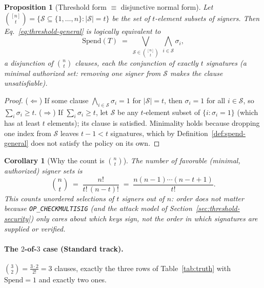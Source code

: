 \documentclass[11pt,a4paper]{article}
\theoremstyle{plain}
\newtheorem{proposition}[theorem]{Proposition}
\newtheorem{corollary}[theorem]{Corollary}
\theoremstyle{definition}
\begin{document}
\begin{proposition}[Threshold form $\equiv$ disjunctive normal form]\label{prop:dnf-general}
Let $\binom{[n]}{t}=\{\mathcal{S}\subseteq\{1,\dots,n\}:|\mathcal{S}|=t\}$ be the
set of $t$-element subsets of signers. Then Eq.~\eqref{eq:threshold-general} is
logically equivalent to
\begin{equation}\label{eq:dnf-general}
    \mathrm{Spend}(T)\;=\;\bigvee_{\mathcal{S}\in\binom{[n]}{t}}\ \bigwedge_{i\in\mathcal{S}}\sigma_i,
\end{equation}
a disjunction of $\binom{n}{t}$ clauses, each the conjunction of exactly $t$
signatures (a \emph{minimal authorized set}: removing one signer from
$\mathcal{S}$ makes the clause unsatisfiable).
\end{proposition}

\begin{proof}
($\Leftarrow$) If some clause $\bigwedge_{i\in\mathcal{S}}\sigma_i=1$ for
$|\mathcal{S}|=t$, then $\sigma_i=1$ for all $i\in\mathcal{S}$, so
$\sum_i\sigma_i\ge t$.
($\Rightarrow$) If $\sum_i\sigma_i\ge t$, let $\mathcal{S}$ be any $t$-element
subset of $\{i:\sigma_i=1\}$ (which has at least $t$ elements); its clause is
satisfied. Minimality holds because dropping one index from $\mathcal{S}$
leaves $t-1<t$ signatures, which by Definition~\ref{def:spend-general} does
not satisfy the policy on its own.
\end{proof}

\begin{corollary}[Why the count is $\binom{n}{t}$]\label{cor:count}
The number of favorable (minimal, authorized) signer sets is
\begin{equation}
    \binom{n}{t} \;=\; \frac{n!}{t!\,(n-t)!} \;=\; \frac{n(n-1)\cdots(n-t+1)}{t!}.
\end{equation}
This counts \emph{unordered} selections of $t$ signers out of $n$: order does
not matter because \texttt{OP\_CHECKMULTISIG} (and the attack model of
Section~\ref{sec:threshold-security}) only cares about \emph{which} keys sign,
not the order in which signatures are supplied or verified.
\end{corollary}

\paragraph{The $2$-of-$3$ case (Standard track).} $\binom{3}{2}=\frac{3\cdot2}{2!}=3$
clauses, exactly the three rows of Table~\ref{tab:truth} with $\mathrm{Spend}=1$
and exactly two ones.
\end{document}

